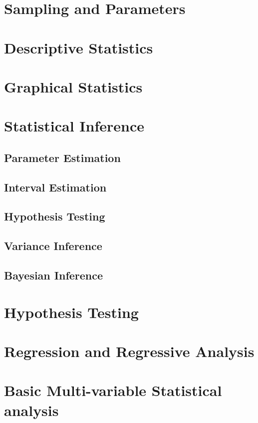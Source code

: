 \chapterspaceabove{6.75cm} 
\chapterspacebelow{7.25cm} 
\chapter{Sampling and Parameters}


\chapterspaceabove{6.75cm} 
\chapterspacebelow{7.25cm} 
\chapter{Descriptive Statistics}


\chapterspaceabove{6.75cm} 
\chapterspacebelow{7.25cm} 
\chapter{Graphical Statistics}



\chapterspaceabove{6.75cm} 
\chapterspacebelow{7.25cm} 
\chapter{Statistical Inference}
    \section{Parameter Estimation}
    \section{Interval Estimation}
    \section{Hypothesis Testing}
    \section{Variance Inference}
    \section{Bayesian Inference}
    

\chapterspaceabove{6.75cm} 
\chapterspacebelow{7.25cm} 
\chapter{Hypothesis Testing}


\chapterspaceabove{6.75cm} 
\chapterspacebelow{7.25cm} 
\chapter{Regression and Regressive Analysis}


\chapterspaceabove{6.75cm} 
\chapterspacebelow{7.25cm} 
\chapter{Basic Multi-variable Statistical analysis}
